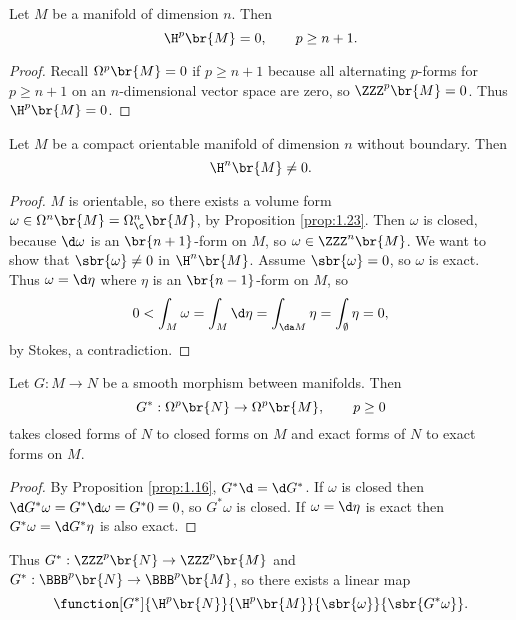 \begin{proposition}
\label{prop:2.5}
Let $ M $ be a manifold of dimension $ n $. Then
$$ \H^p\br{M} = 0, \qquad p \ge n + 1. $$
\end{proposition}

\begin{proof}
Recall $ \Omega^p\br{M} = 0 $ if $ p \ge n + 1 $ because all alternating $ p $-forms for $ p \ge n + 1 $ on an $ n $-dimensional vector space are zero, so $ \ZZZ^p\br{M} = 0 $. Thus $ \H^p\br{M} = 0 $.
\end{proof}

\begin{proposition}
Let $ M $ be a compact orientable manifold of dimension $ n $ without boundary. Then
$$ \H^n\br{M} \ne 0. $$
\end{proposition}

\begin{proof}
$ M $ is orientable, so there exists a volume form $ \omega \in \Omega^n\br{M} = \Omega_\c^n\br{M} $, by Proposition \ref{prop:1.23}. Then $ \omega $ is closed, because $ \d\omega $ is an $ \br{n + 1} $-form on $ M $, so $ \omega \in \ZZZ^n\br{M} $. We want to show that $ \sbr{\omega} \ne 0 $ in $ \H^n\br{M} $. Assume $ \sbr{\omega} = 0 $, so $ \omega $ is exact. Thus $ \omega = \d\eta $ where $ \eta $ is an $ \br{n - 1} $-form on $ M $, so
$$ 0 < \int_M \omega = \int_M \d\eta = \int_{\da M} \eta = \int_\emptyset \eta = 0, $$
by Stokes, a contradiction.
\end{proof}

\pagebreak

\begin{proposition}
\label{prop:2.7}
Let $ G : M \to N $ be a smooth morphism between manifolds. Then
$$ G^* : \Omega^p\br{N} \to \Omega^p\br{M}, \qquad p \ge 0 $$
takes closed forms of $ N $ to closed forms on $ M $ and exact forms of $ N $ to exact forms on $ M $.
\end{proposition}

\begin{proof}
By Proposition \ref{prop:1.16}, $ G^*\d = \d G^* $. If $ \omega $ is closed then $ \d G^*\omega = G^*\d\omega = G^*0 = 0 $, so $ G^*\omega $ is closed. If $ \omega = \d\eta $ is exact then $ G^*\omega = \d G^*\eta $ is also exact.
\end{proof}

Thus $ G^* : \ZZZ^p\br{N} \to \ZZZ^p\br{M} $ and $ G^* : \BBB^p\br{N} \to \BBB^p\br{M} $, so there exists a linear map
$$ \function[G^*]{\H^p\br{N}}{\H^p\br{M}}{\sbr{\omega}}{\sbr{G^*\omega}}. $$

